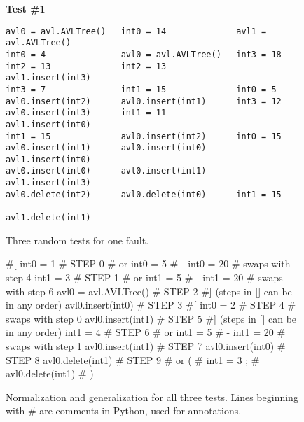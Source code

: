 \begin{figure}[t]
{\scriptsize
\raggedright
{\bf Test \#1}\hspace{.7in}{\bf Test \#2} \hspace{0.65in}{\bf Test \#3}
\begin{verbatim}
avl0 = avl.AVLTree()   int0 = 14              avl1 = avl.AVLTree()
int0 = 4               avl0 = avl.AVLTree()   int3 = 18 
int2 = 13              int2 = 13              avl1.insert(int3) 
int3 = 7               int1 = 15              int0 = 5 
avl0.insert(int2)      avl0.insert(int1)      int3 = 12 
avl0.insert(int3)      int1 = 11              avl1.insert(int0) 
int1 = 15              avl0.insert(int2)      int0 = 15 
avl0.insert(int1)      avl0.insert(int0)      avl1.insert(int0) 
avl0.insert(int0)      avl0.insert(int1)      avl1.insert(int3) 
avl0.delete(int2)      avl0.delete(int0)      int1 = 15 
                                              avl1.delete(int1) 
\end{verbatim}
}
\caption {{Three random tests for one fault.}}
\label{threetests}
\end{figure}

\begin{figure}[t]
{\scriptsize
\begin{code}
\textcolor{black!60}{\#[}
int0 = 1                              \textcolor{black!60}{\# STEP 0}
\textcolor{black!60}{\#  or int0 = 5 }
\textcolor{black!60}{\#   - int0 = 20} 
\textcolor{black!60}{\#  swaps with step 4}
int1 = 3                              \textcolor{black!60}{\# STEP 1}
\textcolor{black!60}{\#  or int1 = 5 }
\textcolor{black!60}{\#   - int1 = 20} 
\textcolor{black!60}{\#  swaps with step 6}
avl0 = avl.AVLTree()                  \textcolor{black!60}{\# STEP 2}
\textcolor{black!60}{\#] (steps in [] can be in any order)}
avl0.insert(int0)                     \textcolor{black!60}{\# STEP 3}
\textcolor{black!60}{\#[}
int0 = 2                              \textcolor{black!60}{\# STEP 4}
\textcolor{black!60}{\#  swaps with step 0}
avl0.insert(int1)                     \textcolor{black!60}{\# STEP 5}
\textcolor{black!60}{\#] (steps in [] can be in any order)}
int1 = 4                              \textcolor{black!60}{\# STEP 6}
\textcolor{black!60}{\#  or int1 = 5 }
\textcolor{black!60}{\#   - int1 = 20} 
\textcolor{black!60}{\#  swaps with step 1}
avl0.insert(int1)                     \textcolor{black!60}{\# STEP 7}
avl0.insert(int0)                     \textcolor{black!60}{\# STEP 8}
avl0.delete(int1)                     \textcolor{black!60}{\# STEP 9}
\textcolor{black!60}{\#  or (}
\textcolor{black!60}{\#      int1 = 3  ;}
\textcolor{black!60}{\#      avl0.delete(int1) }
\textcolor{black!60}{\#     )}
\end{code}
}
\caption{{Normalization and generalization for all three tests.
  Lines beginning with \# are comments in Python, used for annotations.}}
\label{normalgen}
\end{figure}

